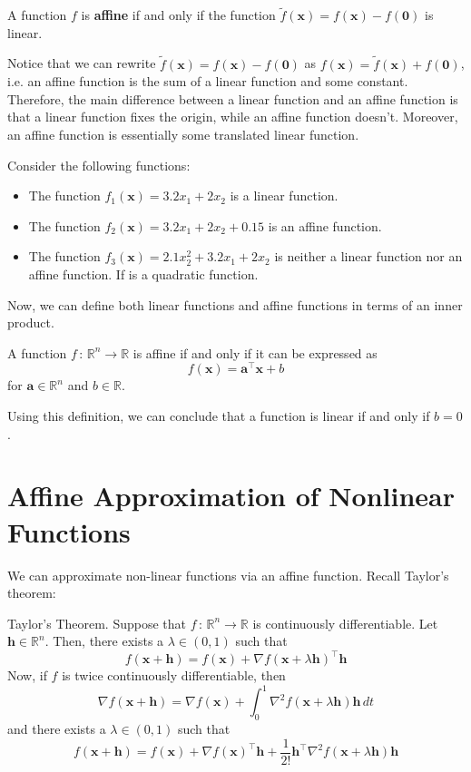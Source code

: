 \documentclass[12pt]{article}
\begin{document}
\begin{definition}
A function $f$ is \textbf{affine} if and only if the function $\tilde{f}(\mathbf{x}) = f(\mathbf{x})- f(\mathbf{0})$ is linear.
\end{definition}
\noindent Notice that we can rewrite $\tilde{f}(\mathbf{x}) = f(\mathbf{x}) - f(\mathbf{0})$ as $f(\mathbf{x}) = \tilde{f}(\mathbf{x}) + f(\mathbf{0})$, i.e. an affine function is the sum of a linear function and some constant. Therefore, the main difference between a linear function and an affine function is that a linear function fixes the origin, while an affine function doesn't. Moreover, an affine function is essentially some translated linear function. 
\begin{example}
Consider the following functions:
\begin{itemize}
\item The function $f_1(\mathbf{x}) = 3.2x_1+2x_2$ is a linear function.
\item The function $f_2(\mathbf{x}) = 3.2x_1+2x_2 + 0.15$ is an affine function.
\item The function $f_3(\mathbf{x}) = 2.1x_2^2 + 3.2x_1+2x_2$ is neither a linear function nor an affine function. If is a quadratic function.
\end{itemize}
\end{example}
\noindent Now, we can define both linear functions and affine functions in terms of an inner product.
\begin{definition}
A function $f\,:\, \mathbb{R}^n\to \mathbb{R}$ is affine if and only if it can be expressed as $$f(\mathbf{x}) = \mathbf{a}^\top\mathbf{x} + b$$ for $\mathbf{a}\in\mathbb{R}^n$ and $b\in\mathbb{R}$.
\end{definition}
\noindent Using this definition, we can conclude that a function is linear if and only if $b=0$.

\section{Affine Approximation of Nonlinear Functions}
We can approximate non-linear functions via an affine function. Recall Taylor's theorem:
\begin{theorem}
Taylor's Theorem. Suppose that $f\,:\,\mathbb{R}^n\to\mathbb{R}$ is continuously differentiable. Let $\mathbf{h}\in\mathbb{R}^n$. Then, there exists a $\lambda\in (0,1)$ such that $$f(\mathbf{x}+\mathbf{h}) = f(\mathbf{x}) + \nabla f(\mathbf{x}+ \lambda\mathbf{h})^\top\mathbf{h}$$ Now, if $f$ is twice continuously differentiable, then $$\nabla f(\mathbf{x}+\mathbf{h}) = \nabla f(\mathbf{x}) + \int_0^1 \nabla^2 f(\mathbf{x}+\lambda\mathbf{h})\mathbf{h}\,dt$$ and there exists a $\lambda\in (0,1)$ such that $$f(\mathbf{x}+\mathbf{h}) = f(\mathbf{x}) + \nabla f(\mathbf{x})^\top\mathbf{h} + \frac{1}{2!}\mathbf{h}^\top\nabla^2f(\mathbf{x}+\lambda \mathbf{h})\mathbf{h}$$
\end{theorem}
\end{document}
